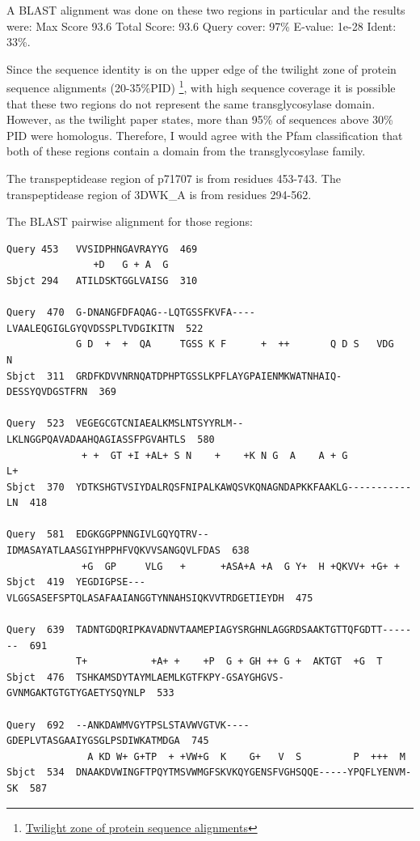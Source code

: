 \documentclass[11pt]{article}
\begin{document}
A BLAST alignment was done on these two regions in particular and 
the results were: Max Score 93.6 Total Score: 93.6 Query cover: 97\% E-value: 1e-28 Ident: 33\%.

Since the sequence identity is on the upper edge of the twilight zone of protein sequence
alignments (20-35\%PID) 
\footnote{\href{http://peds.oxfordjournals.org/content/12/2/85.full}{Twilight zone of protein sequence alignments}}, 
with high sequence coverage it is possible that these two regions do not represent the same transglycosylase domain. 
However, as the twilight paper states, more than 95\% of sequences above 30\% PID
were homologus. Therefore, I would agree with the Pfam classification that both of 
these regions contain a domain from the transglycosylase family. 

The transpeptidease region of p71707 is from residues 453-743.
The transpeptidease region of 3DWK\_A is from residues 294-562.

The BLAST pairwise alignment for those regions:

\begin{verbatim}
Query 453   VVSIDPHNGAVRAYYG  469
               +D   G + A  G
Sbjct 294   ATILDSKTGGLVAISG  310

Query  470  G-DNANGFDFAQAG--LQTGSSFKVFA----LVAALEQGIGLGYQVDSSPLTVDGIKITN  522
            G D  +  +  QA     TGSS K F      +  ++       Q D S   VDG    N
Sbjct  311  GRDFKDVVNRNQATDPHPTGSSLKPFLAYGPAIENMKWATNHAIQ-DESSYQVDGSTFRN  369

Query  523  VEGEGCGTCNIAEALKMSLNTSYYRLM--LKLNGGPQAVADAAHQAGIASSFPGVAHTLS  580
             + +  GT +I +AL+ S N    +    +K N G  A    A + G           L+
Sbjct  370  YDTKSHGTVSIYDALRQSFNIPALKAWQSVKQNAGNDAPKKFAAKLG-----------LN  418

Query  581  EDGKGGPPNNGIVLGQYQTRV--IDMASAYATLAASGIYHPPHFVQKVVSANGQVLFDAS  638
             +G  GP     VLG   +      +ASA+A +A  G Y+  H +QKVV+ +G+ +    
Sbjct  419  YEGDIGPSE---VLGGSASEFSPTQLASAFAAIANGGTYNNAHSIQKVVTRDGETIEYDH  475

Query  639  TADNTGDQRIPKAVADNVTAAMEPIAGYSRGHNLAGGRDSAAKTGTTQFGDTT-------  691
            T+           +A+ +    +P  G + GH ++ G +  AKTGT  +G  T       
Sbjct  476  TSHKAMSDYTAYMLAEMLKGTFKPY-GSAYGHGVS-GVNMGAKTGTGTYGAETYSQYNLP  533

Query  692  --ANKDAWMVGYTPSLSTAVWVGTVK----GDEPLVTASGAAIYGSGLPSDIWKATMDGA  745
              A KD W+ G+TP  + +VW+G  K    G+   V  S         P  +++  M   
Sbjct  534  DNAAKDVWINGFTPQYTMSVWMGFSKVKQYGENSFVGHSQQE-----YPQFLYENVM-SK  587
\end{verbatim}
\end{document}
